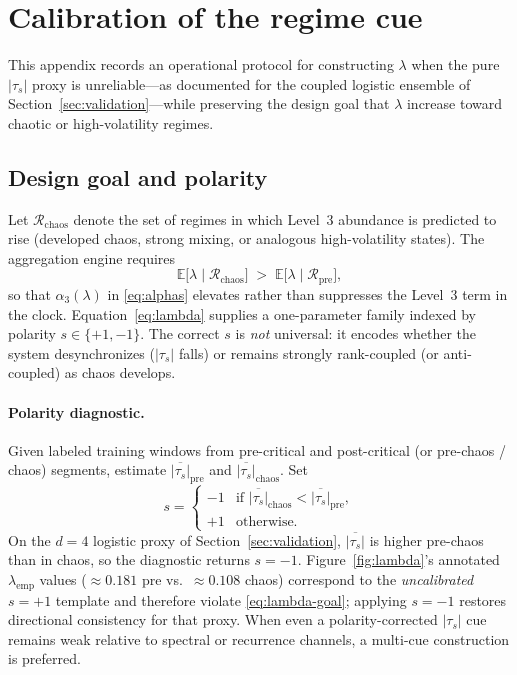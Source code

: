 \documentclass[11pt,a4paper]{article}
\begin{document}
\appendix
\section{Calibration of the regime cue}
\label{app:lambda}

This appendix records an operational protocol for constructing
$\lambda$ when the pure $|\tau_s|$ proxy is unreliable---as documented
for the coupled logistic ensemble of Section~\ref{sec:validation}---while
preserving the design goal that $\lambda$ increase toward chaotic or
high-volatility regimes.

\subsection{Design goal and polarity}

Let $\mathcal{R}_{\mathrm{chaos}}$ denote the set of regimes in which
Level~3 abundance is predicted to rise (developed chaos, strong mixing,
or analogous high-volatility states). The aggregation engine requires
\begin{equation}
\label{eq:lambda-goal}
\mathbb{E}\bigl[\lambda \mid \mathcal{R}_{\mathrm{chaos}}\bigr]
\;>\;
\mathbb{E}\bigl[\lambda \mid \mathcal{R}_{\mathrm{pre}}\bigr],
\end{equation}
so that $\alpha_3(\lambda)$ in \eqref{eq:alphas} elevates rather than
suppresses the Level~3 term in the clock. Equation~\eqref{eq:lambda}
supplies a one-parameter family indexed by polarity $s\in\{+1,-1\}$.
The correct $s$ is \emph{not} universal: it encodes whether the system
desynchronizes ($|\tau_s|$ falls) or remains strongly rank-coupled (or
anti-coupled) as chaos develops.

\paragraph{Polarity diagnostic.}
Given labeled training windows from pre-critical and post-critical (or
pre-chaos / chaos) segments, estimate
$\overline{|\tau_s|}_{\mathrm{pre}}$ and
$\overline{|\tau_s|}_{\mathrm{chaos}}$. Set
\begin{equation}
s
=
\begin{cases}
-1 & \text{if }
\overline{|\tau_s|}_{\mathrm{chaos}}
<\overline{|\tau_s|}_{\mathrm{pre}},\\
+1 & \text{otherwise.}
\end{cases}
\end{equation}
On the $d=4$ logistic proxy of Section~\ref{sec:validation},
$\overline{|\tau_s|}$ is higher pre-chaos than in chaos, so the
diagnostic returns $s=-1$. Figure~\ref{fig:lambda}'s annotated
$\lambda_{\mathrm{emp}}$ values ($\approx 0.181$ pre vs.\
$\approx 0.108$ chaos) correspond to the \emph{uncalibrated}
$s=+1$ template and therefore violate \eqref{eq:lambda-goal}; applying
$s=-1$ restores directional consistency for that proxy. When even a
polarity-corrected $|\tau_s|$ cue remains weak relative to spectral or
recurrence channels, a multi-cue construction is preferred.
\end{document}
